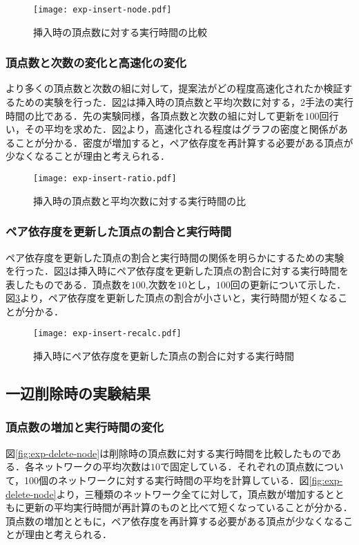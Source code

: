 \begin{figure}[tb]
  \centering
  \texttt{[image: exp-insert-node.pdf]}
  \caption{挿入時の頂点数に対する実行時間の比較}
  \label{fig:exp-insert-node}
\end{figure}

\subsubsection{頂点数と次数の変化と高速化の変化}
より多くの頂点数と次数の組に対して，提案法がどの程度高速化されたか検証するための実験を行った．図\ref{fig:exp-insert-ratio}は挿入時の頂点数と平均次数に対する，2手法の実行時間の比である．先の実験同様，各頂点数と次数の組に対して更新を$100$回行い，その平均を求めた．図\ref{fig:exp-insert-ratio}より，高速化される程度はグラフの密度と関係があることが分かる．密度が増加すると，ペア依存度を再計算する必要がある頂点が少なくなることが理由と考えられる．

\begin{figure}[tb]
  \centering
  \texttt{[image: exp-insert-ratio.pdf]}
  \caption{挿入時の頂点数と平均次数に対する実行時間の比}
  \label{fig:exp-insert-ratio}
\end{figure}

\subsubsection{ペア依存度を更新した頂点の割合と実行時間}
ペア依存度を更新した頂点の割合と実行時間の関係を明らかにするための実験を行った．図\ref{fig:exp-insert-recalc}は挿入時にペア依存度を更新した頂点の割合に対する実行時間を表したものである．頂点数を$100$,次数を$10$とし，$100$回の更新について示した．図\ref{fig:exp-insert-recalc}より，ペア依存度を更新した頂点の割合が小さいと，実行時間が短くなることが分かる．

\begin{figure}[tb]
  \centering
  \texttt{[image: exp-insert-recalc.pdf]}
  \caption{挿入時にペア依存度を更新した頂点の割合に対する実行時間}
  \label{fig:exp-insert-recalc}
\end{figure}

\subsection{一辺削除時の実験結果}

\subsubsection{頂点数の増加と実行時間の変化}
図\ref{fig:exp-delete-node}は削除時の頂点数に対する実行時間を比較したものである．各ネットワークの平均次数は$10$で固定している．それぞれの頂点数について，100個のネットワークに対する実行時間の平均を計算している．図\ref{fig:exp-delete-node}より，三種類のネットワーク全てに対して，頂点数が増加するとともに更新の平均実行時間が再計算のものと比べて短くなっていることが分かる．頂点数の増加とともに，ペア依存度を再計算する必要がある頂点が少なくなることが理由と考えられる．

